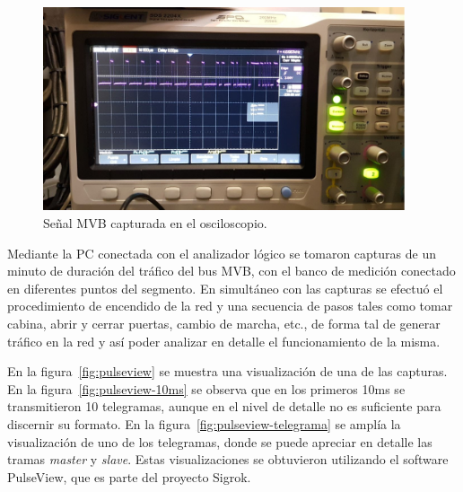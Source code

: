 \begin{figure}[htbp]
	\centering
	\includegraphics[width=0.95\textwidth]{./Figures/osciloscopio.jpg}
	\caption{Señal MVB capturada en el osciloscopio.}
    \label{fig:osciloscopio}
\end{figure}

Mediante la PC conectada con el analizador lógico se tomaron capturas de un minuto de duración del tráfico del bus MVB, con el banco de medición conectado en diferentes puntos del segmento.
En simultáneo con las capturas se efectuó el procedimiento de encendido de la red y una secuencia de pasos tales como tomar cabina, abrir y cerrar puertas, cambio de marcha, etc., de forma tal de generar tráfico en la red y así poder analizar en detalle el funcionamiento de la misma.

En la figura~\ref{fig:pulseview} se muestra una visualización de una de las capturas.
En la figura~\ref{fig:pulseview-10ms} se observa que en los primeros 10ms se transmitieron 10 telegramas, aunque en el nivel de detalle no es suficiente para discernir su formato.
En la figura~\ref{fig:pulseview-telegrama} se amplía la visualización de uno de los telegramas, donde se puede apreciar en detalle las tramas \textit{master} y \textit{slave}.
Estas visualizaciones se obtuvieron utilizando el software PulseView, que es parte del proyecto Sigrok.

